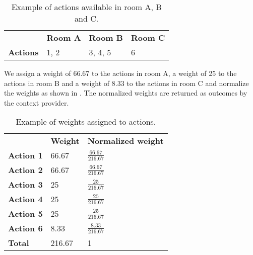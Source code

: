 \begin{table}[h!]
\centering
\caption{Example of actions available in room A, B and C.}
\label{tbl:sec:design:position-context-provider:actions}
\begin{tabular}{llll}
                 & \textbf{Room A} & \textbf{Room B} & \textbf{Room C} \\
\textbf{Actions} & 1, 2            & 3, 4, 5         & 6   
\end{tabular}
\end{table}

We assign a weight of 66.67 to the actions in room A, a weight of 25 to the actions in room B and a weight of 8.33 to the actions in room C and normalize the weights as shown in . The normalized weights are returned as outcomes by the context provider.

\begin{table}[h!]
\centering
\caption{Example of weights assigned to actions.}
\label{tbl:sec:design:position-context-provider:weighted-actions}
\begin{tabular}{lll}
                  & \textbf{Weight} & \textbf{Normalized weight} \\
\textbf{Action 1} & 66.67              & $\frac{66.67}{216.67}$                   \\
\textbf{Action 2} & 66.67              & $\frac{66.67}{216.67}$                   \\
\textbf{Action 3} & 25              & $\frac{25}{216.67}$                   \\
\textbf{Action 4} & 25              & $\frac{25}{216.67}$                   \\
\textbf{Action 5} & 25              & $\frac{25}{216.67}$                   \\
\textbf{Action 6} & 8.33               & $\frac{8.33}{216.67}$                    \\
\textbf{Total}    & 216.67             & 1                         
\end{tabular}
\end{table}

